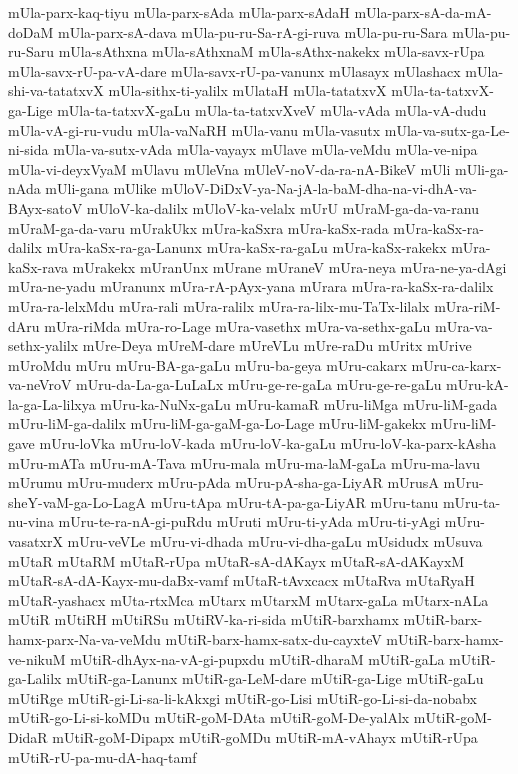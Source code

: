 {mUla-parx-kaq-tiyu
mUla-parx-sAda
mUla-parx-sAdaH
mUla-parx-sA-da-mA-doDaM
mUla-parx-sA-dava
mUla-pu-ru-Sa-rA-gi-ruva
mUla-pu-ru-Sara
mUla-pu-ru-Saru
mUla-sAthxna
mUla-sAthxnaM
mUla-sAthx-nakekx
mUla-savx-rUpa
mUla-savx-rU-pa-vA-dare
mUla-savx-rU-pa-vanunx
mUlasayx
mUlashacx
mUla-shi-va-tatatxvX
mUla-sithx-ti-yalilx
mUlataH
mUla-tatatxvX
mUla-ta-tatxvX-ga-Lige
mUla-ta-tatxvX-gaLu
mUla-ta-tatxvXveV
mUla-vAda
mUla-vA-dudu
mUla-vA-gi-ru-vudu
mUla-vaNaRH
mUla-vanu
mUla-vasutx
mUla-va-sutx-ga-Le-ni-sida
mUla-va-sutx-vAda
mUla-vayayx
mUlave
mUla-veMdu
mUla-ve-nipa
mUla-vi-deyxVyaM
mUlavu
mUleVna
mUleV-noV-da-ra-nA-BikeV
mUli
mUli-ga-nAda
mUli-gana
mUlike
mUloV-DiDxV-ya-Na-jA-la-baM-dha-na-vi-dhA-va-BAyx-satoV
mUloV-ka-dalilx
mUloV-ka-velalx
mUrU
mUraM-ga-da-va-ranu
mUraM-ga-da-varu
mUrakUkx
mUra-kaSxra
mUra-kaSx-rada
mUra-kaSx-ra-dalilx
mUra-kaSx-ra-ga-Lanunx
mUra-kaSx-ra-gaLu
mUra-kaSx-rakekx
mUra-kaSx-rava
mUrakekx
mUranUnx
mUrane
mUraneV
mUra-neya
mUra-ne-ya-dAgi
mUra-ne-yadu
mUranunx
mUra-rA-pAyx-yana
mUrara
mUra-ra-kaSx-ra-dalilx
mUra-ra-lelxMdu
mUra-rali
mUra-ralilx
mUra-ra-lilx-mu-TaTx-lilalx
mUra-riM-dAru
mUra-riMda
mUra-ro-Lage
mUra-vasethx
mUra-va-sethx-gaLu
mUra-va-sethx-yalilx
mUre-Deya
mUreM-dare
mUreVLu
mUre-raDu
mUritx
mUrive
mUroMdu
mUru
mUru-BA-ga-gaLu
mUru-ba-geya
mUru-cakarx
mUru-ca-karx-va-neVroV
mUru-da-La-ga-LuLaLx
mUru-ge-re-gaLa
mUru-ge-re-gaLu
mUru-kA-la-ga-La-lilxya
mUru-ka-NuNx-gaLu
mUru-kamaR
mUru-liMga
mUru-liM-gada
mUru-liM-ga-dalilx
mUru-liM-ga-gaM-ga-Lo-Lage
mUru-liM-gakekx
mUru-liM-gave
mUru-loVka
mUru-loV-kada
mUru-loV-ka-gaLu
mUru-loV-ka-parx-kAsha
mUru-mATa
mUru-mA-Tava
mUru-mala
mUru-ma-laM-gaLa
mUru-ma-lavu
mUrumu
mUru-muderx
mUru-pAda
mUru-pA-sha-ga-LiyAR
mUrusA
mUru-sheY-vaM-ga-Lo-LagA
mUru-tApa
mUru-tA-pa-ga-LiyAR
mUru-tanu
mUru-ta-nu-vina
mUru-te-ra-nA-gi-puRdu
mUruti
mUru-ti-yAda
mUru-ti-yAgi
mUru-vasatxrX
mUru-veVLe
mUru-vi-dhada
mUru-vi-dha-gaLu
mUsidudx
mUsuva
mUtaR
mUtaRM
mUtaR-rUpa
mUtaR-sA-dAKayx
mUtaR-sA-dAKayxM
mUtaR-sA-dA-Kayx-mu-daBx-vamf
mUtaR-tAvxcacx
mUtaRva
mUtaRyaH
mUtaR-yashacx
mUta-rtxMca
mUtarx
mUtarxM
mUtarx-gaLa
mUtarx-nALa
mUtiR
mUtiRH
mUtiRSu
mUtiRV-ka-ri-sida
mUtiR-barxhamx
mUtiR-barx-hamx-parx-Na-va-veMdu
mUtiR-barx-hamx-satx-du-cayxteV
mUtiR-barx-hamx-ve-nikuM
mUtiR-dhAyx-na-vA-gi-pupxdu
mUtiR-dharaM
mUtiR-gaLa
mUtiR-ga-Lalilx
mUtiR-ga-Lanunx
mUtiR-ga-LeM-dare
mUtiR-ga-Lige
mUtiR-gaLu
mUtiRge
mUtiR-gi-Li-sa-li-kAkxgi
mUtiR-go-Lisi
mUtiR-go-Li-si-da-nobabx
mUtiR-go-Li-si-koMDu
mUtiR-goM-DAta
mUtiR-goM-De-yalAlx
mUtiR-goM-DidaR
mUtiR-goM-Dipapx
mUtiR-goMDu
mUtiR-mA-vAhayx
mUtiR-rUpa
mUtiR-rU-pa-mu-dA-haq-tamf
}
